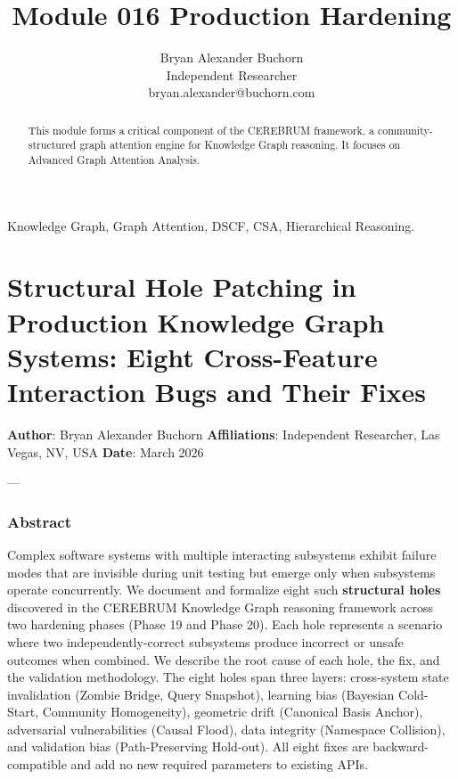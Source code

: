 \documentclass[10pt,journal,compsoc]{IEEEtran}
\begin{document}
\title{Module 016 Production Hardening}
\author{Bryan Alexander Buchorn \\ Independent Researcher \\ bryan.alexander@buchorn.com}

\maketitle

\begin{abstract}
This module forms a critical component of the CEREBRUM framework, a community-structured graph attention engine for Knowledge Graph reasoning. It focuses on Advanced Graph Attention Analysis.
\end{abstract}

\begin{IEEEkeywords}
Knowledge Graph, Graph Attention, DSCF, CSA, Hierarchical Reasoning.
\end{IEEEkeywords}

\section{Structural Hole Patching in Production Knowledge Graph Systems: Eight Cross-Feature Interaction Bugs and Their Fixes}

\textbf{Author}: Bryan Alexander Buchorn
\textbf{Affili\-ations}: Independent Researcher, Las Vegas, NV, USA
\textbf{Date}: March 2026

---

\subsubsection{Abstract}
Complex software systems with multiple interacting subsystems exhibit failure modes that are invisible during unit testing but emerge only when subsystems operate concu\-rrently. We document and formalize eight such \textbf{structural holes} discovered in the CEREBRUM Knowledge Graph reasoning framework across two hardening phases (Phase 19 and Phase 20). Each hole represents a scenario where two indep\-endently-correct subsystems produce incorrect or unsafe outcomes when combined. We describe the root cause of each hole, the fix, and the validation methodology. The eight holes span three layers: cross-system state inval\-idation (Zombie Bridge, Query Snapshot), learning bias (Bayesian Cold-Start, Community Homogeneity), geometric drift (Canonical Basis Anchor), adversarial vulne\-rabilities (Causal Flood), data integrity (Namespace Collision), and validation bias (Path-Preserving Hold-out). All eight fixes are backward-compatible and add no new required parameters to existing APIs.
\end{document}
